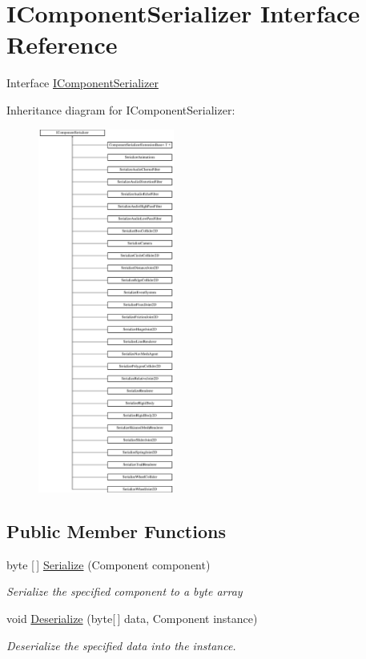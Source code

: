 \hypertarget{interface_i_component_serializer}{}\section{I\+Component\+Serializer Interface Reference}
\label{interface_i_component_serializer}


Interface \hyperlink{interface_i_component_serializer}{I\+Component\+Serializer}  


Inheritance diagram for I\+Component\+Serializer\+:\begin{figure}[H]
\begin{center}
\leavevmode
\includegraphics[height=12.000000cm]{interface_i_component_serializer}
\end{center}
\end{figure}
\subsection*{Public Member Functions}
\begin{DoxyCompactItemize}
\item 
byte \mbox{[}$\,$\mbox{]} \hyperlink{interface_i_component_serializer_ab2aa38005665496b62d6c54b5f0dbd31}{Serialize} (Component component)
\begin{DoxyCompactList}\small\item\em Serialize the specified component to a byte array \end{DoxyCompactList}\item 
void \hyperlink{interface_i_component_serializer_a4cc366a5c78b33d47a90c209d8fed883}{Deserialize} (byte\mbox{[}$\,$\mbox{]} data, Component instance)
\begin{DoxyCompactList}\small\item\em Deserialize the specified data into the instance. \end{DoxyCompactList}\end{DoxyCompactItemize}


